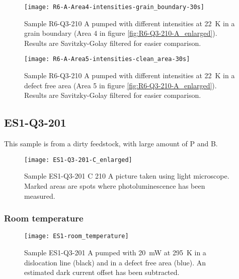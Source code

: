 \begin{figure}[H]
\centering
\texttt{[image: R6-A-Area4-intensities-grain\_boundary-30s]}
\caption[R6-Q3-210 at a grain boundary]{Sample R6-Q3-210 A pumped with different intensities at 22~K in a grain boundary (Area 4 in figure \ref{fig:R6-Q3-210-A_enlarged}). Results are Savitzky-Golay filtered for easier comparison.}
\label{fig:R6-A-Area4-intensities-grain_boundary-30s}%
\end{figure}


\begin{figure}[H]
\centering
\texttt{[image: R6-A-Area5-intensities-clean\_area-30s]}
\caption[R6-Q3-210 at a defect free area]{Sample R6-Q3-210 A pumped with different intensities at 22~K in a defect free area (Area 5 in figure \ref{fig:R6-Q3-210-A_enlarged}). Results are Savitzky-Golay filtered for easier comparison.}
\label{fig:R6-A-Area5-intensities-clean_area-30s}%
\end{figure}








\subsection{ES1-Q3-201}

This sample is from a dirty feedstock, with large amount of P and B.


\begin{figure}[H]
\centering
\texttt{[image: ES1-Q3-201-C\_enlarged]}
\caption[ES1-Q3-201 C from light microscope]{Sample ES1-Q3-201 C 210 A picture taken using light microscope. Marked areas are spots where photoluminescence has been measured.}
\label{fig:ES1-Q3-201-C_enlarged}%
\end{figure}

\subsubsection{Room temperature}

\begin{figure}[H]
\centering
\texttt{[image: ES1-room\_temperature]}
\caption[ES1-Q3-201 at room temperature]{Sample ES1-Q3-201 A pumped with 20~mW at 295~K in a dislocation line (black) and in a defect free area (blue). An estimated dark current offset has been subtracted.}
\label{fig:ES1-room_temperature}%
\end{figure}



